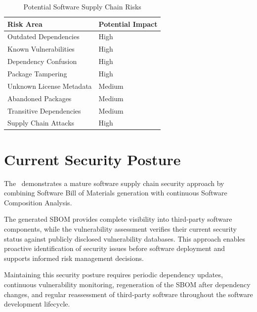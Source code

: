 \begin{table}[H]
\centering
\small
\renewcommand{\arraystretch}{1.3}

\begin{tabular}{p{6cm}p{5cm}}
\toprule
\rowcolor{ZWPrimary}
\textbf{\color{white}Risk Area} & \textbf{\color{white}Potential Impact} \\
\midrule
Outdated Dependencies & High \\
Known Vulnerabilities & High \\
Dependency Confusion & High \\
Package Tampering & High \\
Unknown License Metadata & Medium \\
Abandoned Packages & Medium \\
Transitive Dependencies & Medium \\
Supply Chain Attacks & High \\
\bottomrule
\end{tabular}
\caption{Potential Software Supply Chain Risks}
\end{table}

\vspace{0.4cm}


\section{Current Security Posture}

The \ProjectName\ demonstrates a mature software supply chain security approach by combining Software Bill of Materials generation with continuous Software Composition Analysis.

The generated SBOM provides complete visibility into third-party software components, while the vulnerability assessment verifies their current security status against publicly disclosed vulnerability databases. This approach enables proactive identification of security issues before software deployment and supports informed risk management decisions.

Maintaining this security posture requires periodic dependency updates, continuous vulnerability monitoring, regeneration of the SBOM after dependency changes, and regular reassessment of third-party software throughout the software development lifecycle.

